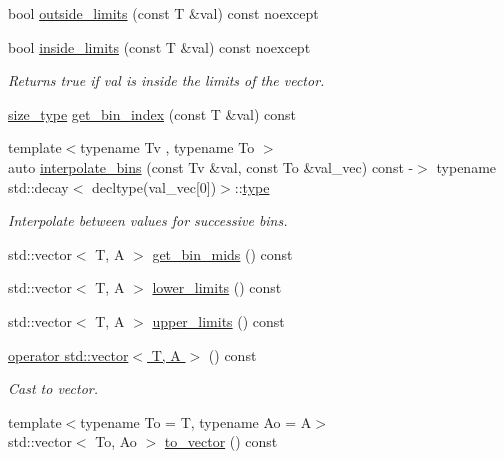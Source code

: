 \begin{DoxyCompactItemize}
bool \hyperlink{classIceBRG_1_1limit__vector_a0ea5ac6558cc90a4812ba93c7e57054b}{outside\+\_\+limits} (const T \&val) const  noexcept
\item 
bool \hyperlink{classIceBRG_1_1limit__vector_a9b47d4b5dc675e647e5a3633d57a69b6}{inside\+\_\+limits} (const T \&val) const  noexcept
\begin{DoxyCompactList}\small\item\em Returns true if val is inside the limits of the vector. \end{DoxyCompactList}\item 
\hyperlink{classIceBRG_1_1limit__vector_a81be3eb6cd519b3f5279ef735ccc4c2f}{size\+\_\+type} \hyperlink{classIceBRG_1_1limit__vector_a13cbaeedb094eebb7e602e81e8112ba7}{get\+\_\+bin\+\_\+index} (const T \&val) const 
\item 
{\footnotesize template$<$typename Tv , typename To $>$ }\\auto \hyperlink{classIceBRG_1_1limit__vector_aad97d38929225a580ae79d495e260630}{interpolate\+\_\+bins} (const Tv \&val, const To \&val\+\_\+vec) const  -\/$>$ typename std\+::decay$<$ decltype(val\+\_\+vec\mbox{[}0\mbox{]})$>$\+::\hyperlink{classIceBRG_1_1limit__vector_a67ad5ccda3b716a3aca2fa6223e75681}{type}
\begin{DoxyCompactList}\small\item\em Interpolate between values for successive bins. \end{DoxyCompactList}\item 
std\+::vector$<$ T, A $>$ \hyperlink{classIceBRG_1_1limit__vector_a0f1c7bc6424a5c498bf9dfdc14312bc4}{get\+\_\+bin\+\_\+mids} () const 
\item 
std\+::vector$<$ T, A $>$ \hyperlink{classIceBRG_1_1limit__vector_a10b4227a05effb6a814bd9cda3c8e778}{lower\+\_\+limits} () const 
\item 
std\+::vector$<$ T, A $>$ \hyperlink{classIceBRG_1_1limit__vector_a1a0c448dbef103bb20f84d99fd1f9bc7}{upper\+\_\+limits} () const 
\item 
\hyperlink{classIceBRG_1_1limit__vector_a7ef5df716da2ceb3ec3ff35f0cd8086b}{operator std\+::vector$<$ T, A $>$} () const 
\begin{DoxyCompactList}\small\item\em Cast to vector. \end{DoxyCompactList}\item 
{\footnotesize template$<$typename To  = T, typename Ao  = A$>$ }\\std\+::vector$<$ To, Ao $>$ \hyperlink{classIceBRG_1_1limit__vector_a129eb3186886eaa417b687774227dd19}{to\+\_\+vector} () const 

\end{DoxyCompactItemize}
